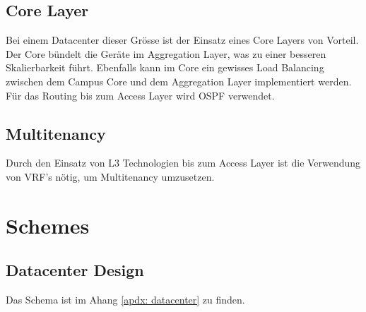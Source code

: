 \subsection{Core Layer}
Bei einem Datacenter dieser Grösse ist der Einsatz eines Core Layers von Vorteil. Der Core bündelt die Geräte im Aggregation Layer, was zu einer besseren Skalierbarkeit führt. Ebenfalls kann im Core ein gewisses Load Balancing zwischen dem Campus Core und dem Aggregation Layer implementiert werden. Für das Routing bis zum Access Layer wird OSPF verwendet.  


\subsection{Multitenancy}
Durch den Einsatz von L3 Technologien bis zum Access Layer ist die Verwendung von VRF's nötig, um Multitenancy umzusetzen.


\section{Schemes}
\subsection{Datacenter Design}
Das Schema ist im Ahang \ref{apdx: datacenter} zu finden.





